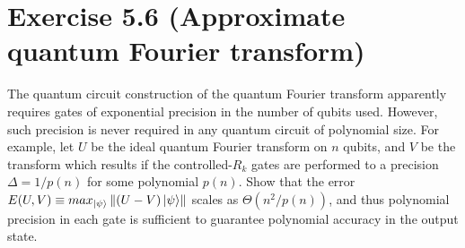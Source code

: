 \documentclass{book}
\begin{document}
\section*{Exercise 5.6 (Approximate quantum Fourier transform)}
    The quantum circuit construction of the quantum Fourier transform apparently requires gates of exponential precision in the number of qubits used. However, such precision is never required in any quantum circuit of polynomial size. For example, let $U$ be the ideal quantum Fourier transform on $n$ qubits, and $V$ be the transform which results if the controlled-$R_k$ gates are performed to a precision $\Delta = 1/p(n)$ for some polynomial $p(n)$. Show that the error $E(U, V) \equiv max_{\ket{\psi}} \left\|(U - V)\ket{\psi}\right\|$ scales as $\Theta(n^2/p(n))$, and thus polynomial precision in each gate is sufficient to guarantee polynomial accuracy in the output state.
\end{document}
